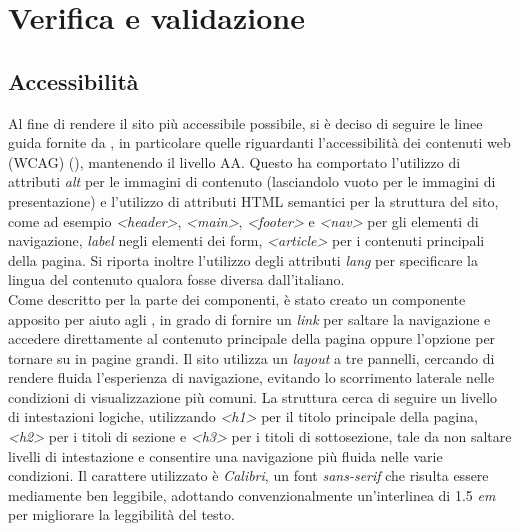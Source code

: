 \chapter{Verifica e validazione}\label{cap:verifica-validazione}


\section{Accessibilità}\label{sec:verifica-validazione-accessibilita}

Al fine di rendere il sito più accessibile possibile, si è deciso di seguire le linee guida fornite da , in particolare quelle riguardanti l'accessibilità dei contenuti web (WCAG) (\cite{site:wcag}), mantenendo il livello AA.\@
Questo ha comportato l'utilizzo di attributi \textit{alt} per le immagini di contenuto (lasciandolo vuoto per le immagini di presentazione) e l'utilizzo di attributi HTML semantici per la struttura del sito, come 
ad esempio \textit{<header>}, \textit{<main>}, \textit{<footer>} e \textit{<nav>} per gli elementi di navigazione, \textit{label} negli elementi dei form, \textit{<article>} per i contenuti principali della pagina.
Si riporta inoltre l'utilizzo degli attributi \textit{lang} per specificare la lingua del contenuto qualora fosse diversa dall'italiano. \\

Come descritto per la parte dei componenti, è stato creato un componente apposito per aiuto agli , in grado di fornire un \textit{link} per saltare la navigazione e accedere direttamente al contenuto principale della pagina
oppure l'opzione per tornare su in pagine grandi.
Il sito utilizza un \textit{layout} a tre pannelli, cercando di rendere fluida l'esperienza di navigazione, evitando lo scorrimento laterale nelle condizioni di visualizzazione più comuni.
La struttura cerca di seguire un livello di intestazioni logiche, utilizzando \textit{<h1>} per il titolo principale della pagina, \textit{<h2>} per i titoli di sezione e \textit{<h3>} per i titoli di sottosezione,
tale da non saltare livelli di intestazione e consentire una navigazione più fluida nelle varie condizioni.
Il carattere utilizzato è \textit{Calibri}, un font \textit{sans-serif} che risulta essere mediamente ben leggibile, adottando convenzionalmente un'interlinea di 1.5 \textit{em} per migliorare la leggibilità del testo. \\

